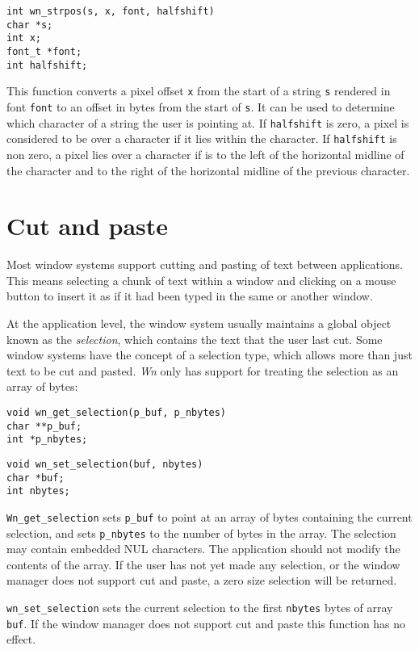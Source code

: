 \begin{verbatim}
int wn_strpos(s, x, font, halfshift)
char *s;
int x;
font_t *font;
int halfshift;
\end{verbatim}
This function converts a pixel offset {\tt x} from the start of a string {\tt s}
rendered in font {\tt font} to an offset in bytes from the start of {\tt s}.
It can be used to determine which character of a string the user is pointing at.
If {\tt halfshift} is zero, a pixel is considered to be over a character if
it lies within the character.  If {\tt halfshift} is non zero, a pixel lies
over a character if is to the left of the horizontal midline of the character
and to the right of the horizontal midline of the previous character.
\section{Cut and paste}
Most window systems support cutting and pasting of text between applications.
This means selecting a chunk of text within a window and clicking on a
mouse button to insert it as if it had been typed in the same or another
window.

At the application level, the window system usually maintains a global
object known as the {\em selection}, which contains the text that the
user last cut.  Some window systems have the concept of a selection type,
which allows more than just text to be cut and pasted.
{\em Wn} only has support for treating the selection as an array of bytes:
\begin{verbatim}
void wn_get_selection(p_buf, p_nbytes)
char **p_buf;
int *p_nbytes;
\end{verbatim}

\begin{verbatim}
void wn_set_selection(buf, nbytes)
char *buf;
int nbytes;
\end{verbatim}
{\tt Wn\_get\_selection} sets {\tt *p\_buf} to point at an array of bytes
containing the current selection, and sets {\tt *p\_nbytes} to the
number of bytes in the array.
The selection may contain embedded NUL characters.
The application should not modify the contents of the array.
If the user has not yet made any selection,
or the window manager does not support cut and paste, a zero size
selection will be returned.  

{\tt wn\_set\_selection} sets the current selection to the
first {\tt nbytes} bytes of array {\tt buf}.
If the window manager does not support cut and paste this function has
no effect.
